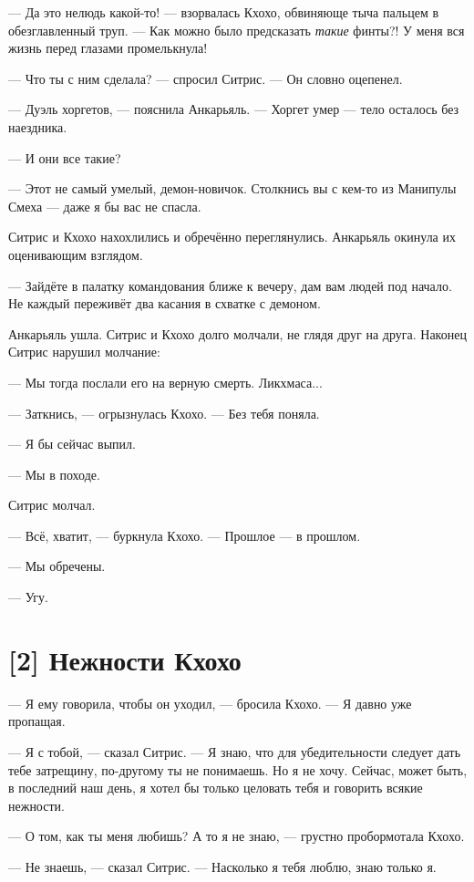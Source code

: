 \documentclass[a4paper,12pt,fleqn]{book}\usepackage{polyglossia}\setdefaultlanguage[babelshorthands=true]{russian}\setotherlanguage{english}\defaultfontfeatures{Ligatures=TeX,Mapping=tex-text}\usepackage{xcolor}\newcommand{\ml}[3]{#2}
\begin{document}
{--- Да это нелюдь какой-то! --- взорвалась Кхохо, обвиняюще тыча пальцем в обезглавленный труп.
--- Как можно было предсказать \emph{такие} финты?!
У меня вся жизнь перед глазами промелькнула!

--- Что ты с ним сделала? --- спросил Ситрис.
--- Он словно оцепенел.

--- Дуэль хоргетов, --- пояснила Анкарьяль.
--- Хоргет умер --- тело осталось без наездника.

--- И они все такие?

--- Этот не самый умелый, демон-новичок.
Столкнись вы с кем-то из Манипулы Смеха --- даже я бы вас не спасла.

Ситрис и Кхохо нахохлились и обречённо переглянулись.
Анкарьяль окинула их оценивающим взглядом.

--- Зайдёте в палатку командования ближе к вечеру, дам вам людей под начало.
Не каждый переживёт два касания в схватке с демоном.

Анкарьяль ушла.
Ситрис и Кхохо долго молчали, не глядя друг на друга.
Наконец Ситрис нарушил молчание:

--- Мы тогда послали его на верную смерть.
Ликхмаса...

--- Заткнись, --- огрызнулась Кхохо.
--- Без тебя поняла.

--- Я бы сейчас выпил.

--- Мы в походе.

Ситрис молчал.

--- Всё, хватит, --- буркнула Кхохо.
--- Прошлое --- в прошлом.

--- Мы обречены.

--- Угу.

\section{[2] Нежности Кхохо}

--- Я ему говорила, чтобы он уходил, --- бросила Кхохо.
--- Я давно уже пропащая.

--- Я с тобой, --- сказал Ситрис.
--- Я знаю, что для убедительности следует дать тебе затрещину, по-другому ты не понимаешь.
Но я не хочу.
Сейчас, может быть, в последний наш день, я хотел бы только целовать тебя и говорить всякие нежности.

--- О том, как ты меня любишь?
А то я не знаю, --- грустно пробормотала Кхохо.

--- Не знаешь, --- сказал Ситрис.
--- Насколько я тебя люблю, знаю только я.

}
\end{document}
